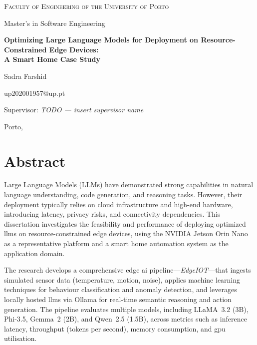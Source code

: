 \documentclass[12pt,a4paper,oneside]{report}
\begin{document}

\begin{titlepage}
\centering
\vspace*{1cm}
{\Large\textsc{Faculty of Engineering of the University of Porto}\par}
\vspace{0.5cm}
{\large Master's in Software Engineering\par}
\vspace{3cm}
{\LARGE\bfseries Optimizing Large Language Models for Deployment on Resource-Constrained Edge Devices:\\ A Smart Home Case Study\par}
\vspace{2cm}
{\Large Sadra Farshid\par}
\vspace{0.5cm}
{\large up202001957@up.pt\par}
\vspace{3cm}
{\large Supervisor: \textit{TODO --- insert supervisor name}\par}
\vfill
{\large Porto, \the\year\par}
\end{titlepage}

\chapter*{Abstract}

Large Language Models (LLMs) have demonstrated strong capabilities in natural language understanding, code generation, and reasoning tasks. However, their deployment typically relies on cloud infrastructure and high-end hardware, introducing latency, privacy risks, and connectivity dependencies. This dissertation investigates the feasibility and performance of deploying optimized \glspl{llm} on resource-constrained edge devices, using the NVIDIA Jetson Orin Nano as a representative platform and a smart home automation system as the application domain.

The research develops a comprehensive edge \gls{ai} pipeline---\textit{EdgeIOT}---that ingests simulated sensor data (temperature, motion, noise), applies machine learning techniques for behaviour classification and anomaly detection, and leverages locally hosted \glspl{llm} via Ollama for real-time semantic reasoning and action generation. The pipeline evaluates multiple models, including LLaMA~3.2 (3B), Phi-3.5, Gemma~2 (2B), and Qwen~2.5 (1.5B), across metrics such as inference latency, throughput (tokens per second), memory consumption, and \gls{gpu} utilisation.
\end{document}
